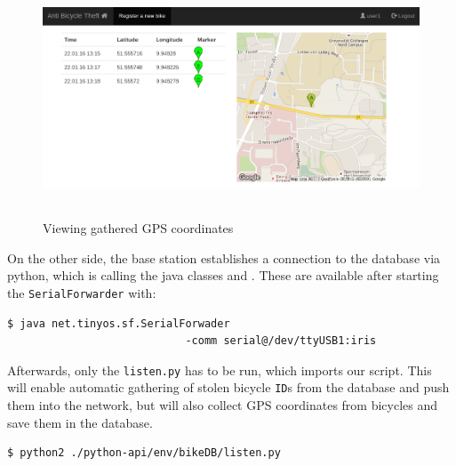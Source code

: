 \documentclass[a4paper]{article}
\begin{document}
\begin{figure}
\begin{center}
\includegraphics[keepaspectratio=false, width=12cm, height=7cm]{pics/view.png}
\end{center}
\caption{Viewing gathered GPS coordinates}
\label{fig:GPSdata}
\end{figure}

On the other side, the base station establishes a connection to the database via python, which is calling the java classes \texttt{} and \texttt{}. These are available after starting the \texttt{SerialForwarder} with:
\begin{lstlisting}[frame=single,language=bash]
$ java net.tinyos.sf.SerialForwader
                            -comm serial@/dev/ttyUSB1:iris
\end{lstlisting}
Afterwards, only the \texttt{listen.py} has to be run, which imports our \texttt{} script. This will enable automatic gathering of stolen bicycle \texttt{ID}s from the database and push them into the network, but will also collect GPS coordinates from bicycles and save them in the database.
\begin{lstlisting}[frame=single]
$ python2 ./python-api/env/bikeDB/listen.py
\end{lstlisting}
\end{document}
